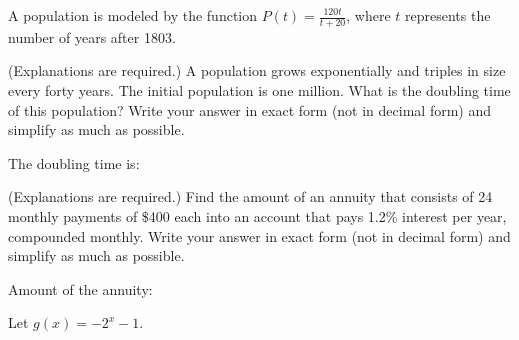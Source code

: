 \documentclass[11pt,answers]{exam}
\begin{document}
\begin{questions}
\begin{minipage}[b]{0.5\linewidth}
\begin{parts}
\end{parts}
\end{minipage}

\question A population is modeled by the function 
$\displaystyle P(t) = 
\frac{120t}{t + 20}$, where  $t$ represents the number of years after 1803. 
\newpage
\question[2] (Explanations are required.) A population grows exponentially and triples in size every forty years. The initial population is one million. What is the doubling time of this population? Write your answer in exact form (not in decimal form) and simplify as much as possible.
\fillwithdottedlines{0.7in}

The doubling time is:\dotfill

\question[2] (Explanations are required.) Find the amount of an annuity that consists of 24 monthly payments of \$400 each into an account that pays 1.2\% interest per year, compounded monthly. Write your answer in exact form (not in decimal form) and simplify as much as possible.
\fillwithdottedlines{0.7in}

Amount of the annuity:\dotfill

\question Let $\displaystyle g(x)=-2^{x}-1$.
\begin{parts}



\end{parts}
\end{questions}
\end{document}
